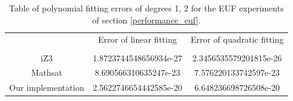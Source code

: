 \begin{table}[h]
  \centering
  \begin{tabular}{ccc}
    \toprule
    {}                 & Error of linear fitting & Error of quadratic fitting \\
    \cmidrule{2-2} \cmidrule{3-3} \\
    iZ3                &  1.8723744548656934e-27 & 2.3456535579201815e-26     \\
    Mathsat            &  8.690566310635247e-23  & 7.576220133742597e-23      \\
    Our implementation &  2.5622746654442585e-20 & 6.648236698726508e-20      \\
    \bottomrule
  \end{tabular}
  \caption{Table of polynomial fitting errors of degrees 1, 2 for the
  EUF experiments of section \ref{performance_euf}.}
\end{table}

